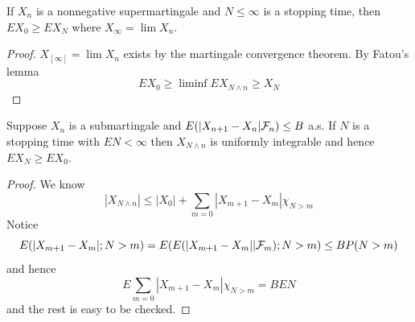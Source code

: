 \begin{theorem}
    If $X_n$ is a nonnegative supermartingale and $N\leq \infty$ is a stopping time, then $EX_0 \geq EX_N$ where $X_{\infty} = \lim X_n$.
\end{theorem}
\begin{proof}
    $X_[\infty] = \lim X_n$ exists by the martingale convergence theorem. By Fatou's lemma
    \[
    EX_0 \geq \liminf EX_{N\wedge n} \geq X_N
    \]
\end{proof}

\begin{theorem}
    Suppose $X_n$ is a submartingale and $E(|X_{n+1}-X_n|\mathcal{F}_n) \leq B$ a.s. If $N$ is a stopping time with $EN < \infty$ then $X_{N\wedge n}$ is uniformly integrable and hence $EX_N \geq EX_0$.
\end{theorem}
\begin{proof}
    We know
    \[|X_{N\wedge n}| \leq |X_0| + \sum\limits_{m=0}|X_{m+1}-X_m|\chi_{N>m}\]
    Notice
    \[
    E(|X_{m+1}-X_m|;N>m) = E(E(|X_{m+1}-X_m||\mathcal{F}_m); N > m) \leq BP(N>m)
    \]
    and hence
    \[
    E\sum\limits_{m=0}|X_{m+1}-X_m|\chi_{N>m} = BEN
    \]
    and the rest is easy to be checked.
\end{proof}
